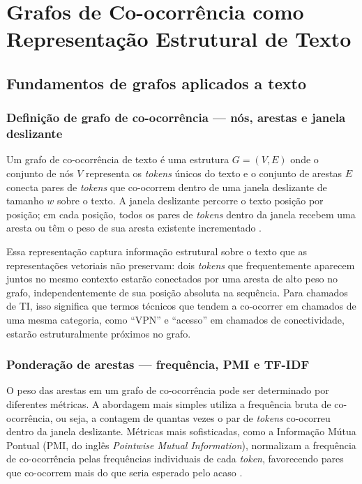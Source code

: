 \documentclass[
    12pt,                %
    openright,           %
    oneside,             %
    a4paper,             %
    english,             %
    brazil               %
]{abntex2}
\begin{document}
\section{Grafos de Co-ocorrência como Representação Estrutural de Texto}
\label{sec:grafos}

\subsection{Fundamentos de grafos aplicados a texto}
\label{subsec:grafos_fundamentos}

\subsubsection{Definição de grafo de co-ocorrência — nós, arestas e janela deslizante}
\label{subsubsec:grafos_definicao}

Um grafo de co-ocorrência de texto é uma estrutura $G = (V, E)$ onde o conjunto de nós $V$ representa os \textit{tokens} únicos do texto e o conjunto de arestas $E$ conecta pares de \textit{tokens} que co-ocorrem dentro de uma janela deslizante de tamanho $w$ sobre o texto. A janela deslizante percorre o texto posição por posição; em cada posição, todos os pares de \textit{tokens} dentro da janela recebem uma aresta ou têm o peso de sua aresta existente incrementado \cite{yao2019}.

Essa representação captura informação estrutural sobre o texto que as representações vetoriais não preservam: dois \textit{tokens} que frequentemente aparecem juntos no mesmo contexto estarão conectados por uma aresta de alto peso no grafo, independentemente de sua posição absoluta na sequência. Para chamados de TI, isso significa que termos técnicos que tendem a co-ocorrer em chamados de uma mesma categoria, como ``VPN'' e ``acesso'' em chamados de conectividade, estarão estruturalmente próximos no grafo.

\subsubsection{Ponderação de arestas — frequência, PMI e TF-IDF}
\label{subsubsec:grafos_ponderacao}

O peso das arestas em um grafo de co-ocorrência pode ser determinado por diferentes métricas. A abordagem mais simples utiliza a frequência bruta de co-ocorrência, ou seja, a contagem de quantas vezes o par de \textit{tokens} co-ocorreu dentro da janela deslizante. Métricas mais sofisticadas, como a Informação Mútua Pontual (PMI, do inglês \textit{Pointwise Mutual Information}), normalizam a frequência de co-ocorrência pelas frequências individuais de cada \textit{token}, favorecendo pares que co-ocorrem mais do que seria esperado pelo acaso \cite{yao2019}.
\end{document}
